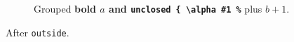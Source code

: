\documentclass{article}
\begin{document}
\begin{figure}
\cprotect\caption{Grouped \textbf{bold $a$ and \verb|unclosed { \alpha #1 %|} plus $b+1$.}
\end{figure}
After \verb|outside|.
\end{document}

